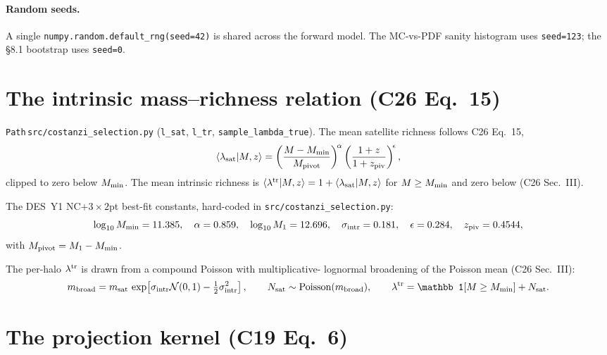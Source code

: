 \documentclass[a4paper, 11pt]{article}
\newcommand{\ltr}{\lambda^{\rm tr}}
\newcommand{\modname}[1]{\textcolor{kwcol}{\texttt{#1}}}
\newcommand{\pyfile}[1]{{\small\texttt{#1}}}
\begin{document}
\paragraph{Random seeds.} A single
\texttt{numpy.random.default\_rng(seed=42)} is shared across the forward
model. The MC-vs-PDF sanity histogram uses \texttt{seed=123}; the §8.1
bootstrap uses \texttt{seed=0}.

\section{The intrinsic mass--richness relation (C26 Eq.~15)}
\label{sec:mass-richness}

\modname{Path}\,\pyfile{src/costanzi\_selection.py}
(\texttt{l\_sat}, \texttt{l\_tr}, \texttt{sample\_lambda\_true}). The mean
satellite richness follows C26 Eq.~15,
\begin{equation}
\label{eq:lsat}
  \langle \lambda_{\rm sat} | M, z \rangle
  = \left( \frac{M - M_{\rm min}}{M_{\rm pivot}} \right)^{\!\alpha}
        \left( \frac{1+z}{1+z_{\rm piv}} \right)^{\!\epsilon},
\end{equation}
clipped to zero below $M_{\rm min}$. The mean intrinsic richness is
$\langle\ltr|M,z\rangle = 1 + \langle\lambda_{\rm sat}|M,z\rangle$ for
$M \ge M_{\rm min}$ and zero below (C26 Sec.~III).

The DES~Y1 NC$+3{\times}2$pt best-fit constants, hard-coded in
\pyfile{src/costanzi\_selection.py}:
\begin{equation*}
  \log_{10} M_{\rm min} = 11.385,\quad
  \alpha = 0.859,\quad
  \log_{10} M_1 = 12.696,\quad
  \sigma_{\rm intr} = 0.181,\quad
  \epsilon = 0.284,\quad
  z_{\rm piv} = 0.4544,
\end{equation*}
with $M_{\rm pivot} = M_1 - M_{\rm min}$.

The per-halo $\ltr$ is drawn from a compound Poisson with multiplicative-
lognormal broadening of the Poisson mean (C26 Sec.~III):
\begin{equation*}
  m_{\rm broad} = m_{\rm sat}\,\exp\!\left[\sigma_{\rm intr}\mathcal N(0, 1)
  - \tfrac{1}{2}\sigma_{\rm intr}^2\right],\qquad
  N_{\rm sat} \sim \mathrm{Poisson}(m_{\rm broad}),\qquad
  \ltr = \mathbb 1[M \ge M_{\rm min}] + N_{\rm sat}.
\end{equation*}

\section{The projection kernel (C19 Eq.~6)}
\label{sec:projection}
\end{document}
